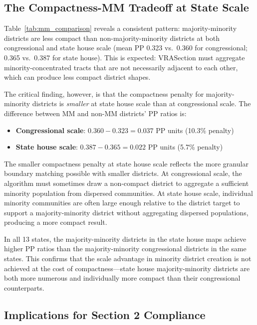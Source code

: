 \subsection{The Compactness-MM Tradeoff at State Scale}

Table~\ref{tab:mm_comparison} reveals a consistent pattern: majority-minority districts are less compact than non-majority-minority districts at both congressional and state house scale (mean PP 0.323 vs.\ 0.360 for congressional; 0.365 vs.\ 0.387 for state house). This is expected: VRASection must aggregate minority-concentrated tracts that are not necessarily adjacent to each other, which can produce less compact district shapes.

The critical finding, however, is that the compactness penalty for majority-minority districts is \textit{smaller} at state house scale than at congressional scale. The difference between MM and non-MM districts' PP ratios is:

\begin{itemize}
\item \textbf{Congressional scale}: $0.360 - 0.323 = 0.037$ PP units (10.3\% penalty)
\item \textbf{State house scale}: $0.387 - 0.365 = 0.022$ PP units (5.7\% penalty)
\end{itemize}

The smaller compactness penalty at state house scale reflects the more granular boundary matching possible with smaller districts. At congressional scale, the algorithm must sometimes draw a non-compact district to aggregate a sufficient minority population from dispersed communities. At state house scale, individual minority communities are often large enough relative to the district target to support a majority-minority district without aggregating dispersed populations, producing a more compact result.

In all 13 states, the majority-minority districts in the state house maps achieve higher PP ratios than the majority-minority congressional districts in the same states. This confirms that the scale advantage in minority district creation is not achieved at the cost of compactness---state house majority-minority districts are both more numerous and individually more compact than their congressional counterparts.

\subsection{Implications for Section 2 Compliance}

